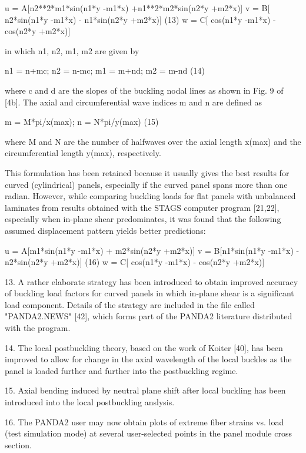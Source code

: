  u = A[n2**2*m1*sin(n1*y -m1*x) +n1**2*m2*sin(n2*y +m2*x)]
 v = B[      n2*sin(n1*y -m1*x) -      n1*sin(n2*y +m2*x)]     (13)
 w = C[         cos(n1*y -m1*x) -         cos(n2*y +m2*x)]

in which n1, n2, m1, m2 are given by

     n1 = n+mc;   n2 = n-mc;   m1 = m+nd;   m2 = m-nd          (14)

where c and d are the slopes of the buckling nodal lines as shown in Fig.
9 of [4b]. The axial and circumferential wave indices m and n are defined
as 

           m = M*pi/x(max);    n = N*pi/y(max)                 (15)

where M and N are the number of halfwaves over the axial length x(max) and
the circumferential length y(max), respectively. 

This formulation has been retained because it usually gives the best
results for curved (cylindrical) panels, especially if the curved panel
spans more than one radian.  However, while comparing buckling loads for
flat panels with unbalanced laminates from results obtained with the STAGS
computer program [21,22], especially when in-plane shear predominates, it
was found that the following assumed displacement pattern yields better
predictions: 

     u = A[m1*sin(n1*y -m1*x) + m2*sin(n2*y +m2*x)]
     v = B[n1*sin(n1*y -m1*x) - n2*sin(n2*y +m2*x)]            (16)
     w = C[   cos(n1*y -m1*x) -    cos(n2*y +m2*x)]

13. A rather elaborate strategy has been introduced to obtain improved
accuracy of buckling load factors for curved panels in which in-plane
shear is a significant load component.  Details of the strategy are
included in the file called "PANDA2.NEWS" [42], which forms part of the
PANDA2 literature distributed with the program. 

14. The local postbuckling theory, based on the work of Koiter [40], has
been improved to allow for change in the axial wavelength of the local
buckles as the panel is loaded further and further into the postbuckling
regime. 

15. Axial bending induced by neutral plane shift after local buckling has
been introduced into the local postbuckling anslysis. 

16. The PANDA2 user may now obtain plots of extreme fiber strains vs. load
(test simulation mode) at several user-selected points in the panel module
cross section. 

